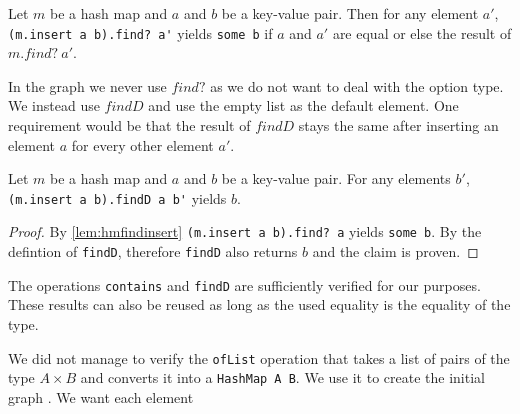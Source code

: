 \begin{lemma}[\StdHashMapfindinsert]\label{lem:hmfindinsert}
  Let $m$ be a hash map and $a$ and $b$ be a key-value pair. Then for any element $a'$, \lstinline|(m.insert a b).find? a'| yields \lstinline|some b| if $a$ and $a'$ are equal or else the result of $m.find?\ a'$.
\end{lemma}

In the graph we never use $find?$ as we do not want to deal with the option type. We instead use $findD$ and use the empty list as the default element. One requirement would be that the result of $findD$ stays the same after inserting an element $a$ for every other element $a'$.

\begin{lemma}
  Let $m$ be a hash map and $a$ and $b$ be a key-value pair. For any elements $b'$,\lstinline|(m.insert a b).findD a b'| yields $b$.
\end{lemma}
\begin{proof}
  By \cref{lem:hmfindinsert} \lstinline|(m.insert a b).find? a| yields \lstinline|some b|. By the defintion of \lstinline|findD|, therefore \lstinline|findD| also returns $b$ and the claim is proven.
\end{proof}

The operations \lstinline|contains| and \lstinline|findD| are sufficiently verified for our purposes. These results can also be reused as long as the used equality is the equality of the type. 

We did not manage to verify the \lstinline|ofList| operation that takes a list of pairs of the type $A \times B$ and converts it into a \lstinline|HashMap A B|. We use it to create the initial graph . We want each element 
